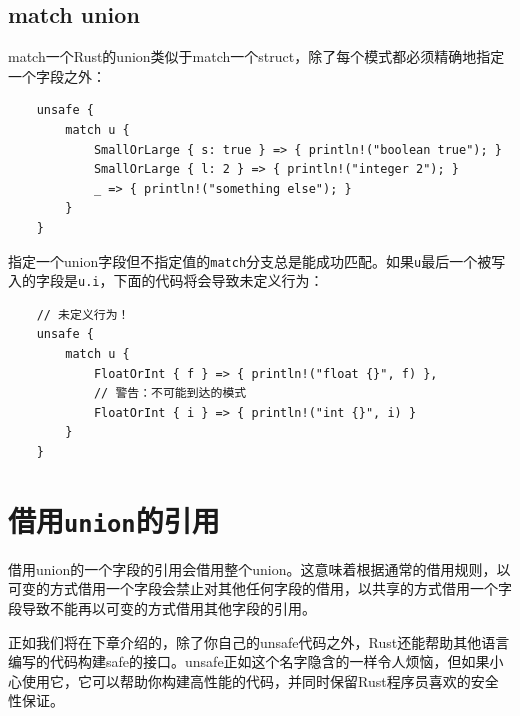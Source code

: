 \subsection{match union}
match一个Rust的union类似于match一个struct，除了每个模式都必须精确地指定一个字段之外：
\begin{verbatim}
    unsafe {
        match u {
            SmallOrLarge { s: true } => { println!("boolean true"); }
            SmallOrLarge { l: 2 } => { println!("integer 2"); }
            _ => { println!("something else"); }
        }
    }
\end{verbatim}

指定一个union字段但不指定值的\texttt{match}分支总是能成功匹配。如果\texttt{u}最后一个被写入的字段是\texttt{u.i}，下面的代码将会导致未定义行为：
\begin{verbatim}
    // 未定义行为！
    unsafe {
        match u {
            FloatOrInt { f } => { println!("float {}", f) },
            // 警告：不可能到达的模式
            FloatOrInt { i } => { println!("int {}", i) }
        }
    }
\end{verbatim}

\section{借用\texttt{union}的引用}
借用union的一个字段的引用会借用整个union。这意味着根据通常的借用规则，以可变的方式借用一个字段会禁止对其他任何字段的借用，以共享的方式借用一个字段导致不能再以可变的方式借用其他字段的引用。

正如我们将在下章介绍的，除了你自己的unsafe代码之外，Rust还能帮助其他语言编写的代码构建safe的接口。unsafe正如这个名字隐含的一样令人烦恼，但如果小心使用它，它可以帮助你构建高性能的代码，并同时保留Rust程序员喜欢的安全性保证。
